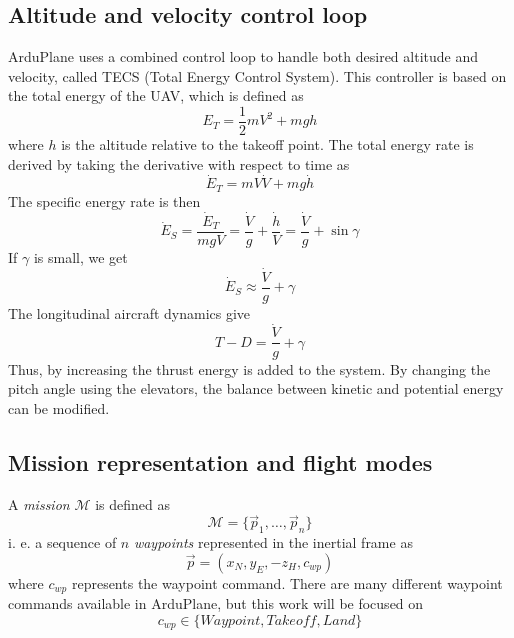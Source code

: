 \subsection{Altitude and velocity control loop}
ArduPlane uses a combined control loop to handle both desired altitude and velocity, called 
TECS (Total Energy Control System). This controller is based on the total energy of the UAV,
which is defined as
\begin{equation}
    E_T=\frac{1}{2}mV^2 + mgh
\end{equation}
where $h$ is the altitude relative to the takeoff point. The total energy rate is derived
by taking the derivative with respect to time as
\begin{equation}
    \dot{E}_T=mV\dot{V} + mg\dot{h}
\end{equation}
The specific energy rate is then
\begin{equation}
    \dot{E}_S = \frac{\dot{E}_T}{mgV} = \frac{\dot{V}}{g} + \frac{\dot{h}}{V} = \frac{\dot{V}}{g} + \sin\gamma
\end{equation}
If $\gamma$ is small, we get
\begin{equation}
    \dot{E}_S\approx\frac{\dot{V}}{g} + \gamma
\end{equation} 
The longitudinal aircraft dynamics give
\begin{equation}
    T-D=\frac{\dot{V}}{g} + \gamma
\end{equation}
Thus, by increasing the thrust
energy is added to the system. By changing the pitch angle using the elevators, the balance 
between kinetic and potential energy can be modified. 
\fi

\subsection{Mission representation and flight modes}\label{sec:mission}
A \textit{mission} $\mathcal{M}$ is defined as 
\begin{equation}
    \mathcal{M} = \{\vec{p}_1, \hdots, \vec{p}_n\}
\end{equation}
i. e. a sequence of $n$ \textit{waypoints} represented in the inertial frame as 
\begin{equation}
    \vec{p}=(x_N, y_E, -z_H, c_{wp})
\end{equation}
where $c_{wp}$ represents the waypoint command. There are many different waypoint commands available
in ArduPlane, but this work will be focused on 
\begin{equation}
    c_{wp}\in \{Waypoint, Takeoff, Land\}
\end{equation}
